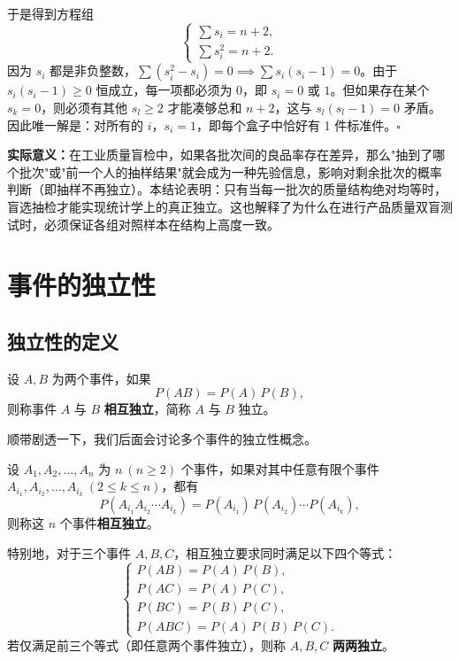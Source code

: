 \documentclass[lang=cn,11pt]{elegantbook}
\begin{document}
\begin{solution}
于是得到方程组
\[
\begin{cases}
\displaystyle\sum s_i = n+2, \\[6pt]
\displaystyle\sum s_i^2 = n+2.
\end{cases}
\]
因为 \(s_i\) 都是非负整数，\(\sum(s_i^2-s_i)=0 \implies \sum s_i(s_i-1)=0\)。由于 \(s_i(s_i-1) \ge 0\) 恒成立，每一项都必须为 0，即 \(s_i = 0\) 或 \(1\)。但如果存在某个 \(s_k = 0\)，则必须有其他 \(s_l \ge 2\) 才能凑够总和 \(n+2\)，这与 \(s_l(s_l-1)=0\) 矛盾。因此唯一解是：对所有的 \(i\)，\(s_i = 1\)，即每个盒子中恰好有 1 件标准件。\hfill\(\square\)

\textbf{实际意义：}在工业质量盲检中，如果各批次间的良品率存在差异，那么"抽到了哪个批次"或"前一个人的抽样结果"就会成为一种先验信息，影响对剩余批次的概率判断（即抽样不再独立）。本结论表明：只有当每一批次的质量结构绝对均等时，盲选抽检才能实现统计学上的真正独立。这也解释了为什么在进行产品质量双盲测试时，必须保证各组对照样本在结构上高度一致。
\end{solution}


\section{事件的独立性}

\subsection{独立性的定义}

\begin{definition}[事件的独立性] \label{def:independence}
设 \(A, B\) 为两个事件，如果
\[
P(AB) = P(A)\,P(B),
\]
则称事件 \(A\) 与 \(B\) \textbf{相互独立}，简称 \(A\) 与 \(B\) 独立。
\end{definition}
顺带剧透一下，我们后面会讨论多个事件的独立性概念。
\begin{definition}[$n$ 个事件的相互独立] \label{def:n-event-independence}
设 \(A_1, A_2, \dots, A_n\) 为 \(n\ (n \ge 2)\) 个事件，如果对其中任意有限个事件 \(A_{i_1}, A_{i_2}, \dots, A_{i_k}\ (2 \le k \le n)\)，都有
\[
P(A_{i_1} A_{i_2} \cdots A_{i_k}) = P(A_{i_1})\,P(A_{i_2}) \cdots P(A_{i_k}),
\]
则称这 \(n\) 个事件\textbf{相互独立}。
\end{definition}

特别地，对于三个事件 \(A, B, C\)，相互独立要求同时满足以下四个等式：
\[
\begin{cases}
P(AB) = P(A)\,P(B), \\
P(AC) = P(A)\,P(C), \\
P(BC) = P(B)\,P(C), \\
P(ABC) = P(A)\,P(B)\,P(C).
\end{cases}
\]
若仅满足前三个等式（即任意两个事件独立），则称 \(A, B, C\) \textbf{两两独立}。
\end{document}
